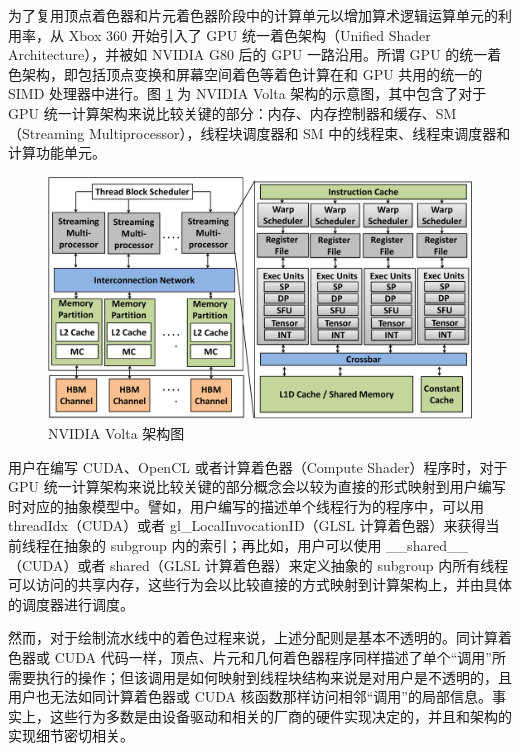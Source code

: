 为了复用顶点着色器和片元着色器阶段中的计算单元以增加算术逻辑运算单元的利用率，从 Xbox 360 \cite{1624324}开始引入了 GPU 统一着色架构（Unified Shader Architecture），并被如 NVIDIA G80 \cite{4523358}后的 GPU 一路沿用。所谓 GPU 的统一着色架构，即包括顶点变换和屏幕空间着色等着色计算在和 GPU 共用的统一的 SIMD 处理器中进行。图 \ref{fig:volta_arch} 为 NVIDIA Volta 架构的示意图，其中包含了对于 GPU 统一计算架构来说比较关键的部分：内存、内存控制器和缓存、SM（Streaming Multiprocessor），线程块调度器和 SM 中的线程束、线程束调度器和计算功能单元。

\begin{figure}
    \centering
    \includegraphics[width=1.0\linewidth]{figures/Volta_archi-crop.pdf}
    \caption{NVIDIA Volta 架构图\cite{9138922}}
    \label{fig:volta_arch}
\end{figure}

用户在编写 CUDA、OpenCL 或者计算着色器（Compute Shader）程序时，对于 GPU 统一计算架构来说比较关键的部分概念会以较为直接的形式映射到用户编写时对应的抽象模型中。譬如，用户编写的描述单个线程行为的程序中，可以用 threadIdx（CUDA）或者 gl\_LocalInvocationID（GLSL 计算着色器）来获得当前线程在抽象的 subgroup 内的索引；再比如，用户可以使用 \_\_shared\_\_（CUDA）或者 shared（GLSL 计算着色器）来定义抽象的 subgroup 内所有线程可以访问的共享内存，这些行为会以比较直接的方式映射到计算架构上，并由具体的调度器进行调度。

然而，对于绘制流水线中的着色过程来说，上述分配则是基本不透明的。同计算着色器或 CUDA 代码一样，顶点、片元和几何着色器程序同样描述了单个“调用”所需要执行的操作；但该调用是如何映射到线程块结构来说是对用户是不透明的，且用户也无法如同计算着色器或 CUDA 核函数那样访问相邻“调用”的局部信息。事实上，这些行为多数是由设备驱动和相关的厂商的硬件实现决定的，并且和架构的实现细节密切相关。


